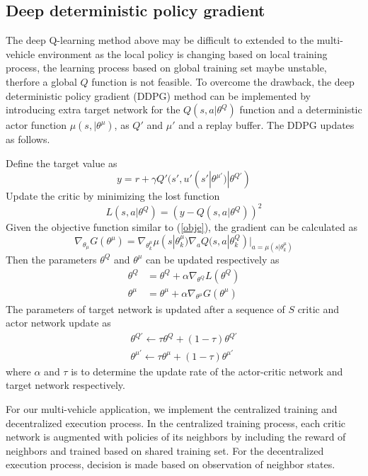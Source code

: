 \documentclass[letterpaper,10 pt,conference]{ieeeconf}
\begin{document}
\subsection{Deep deterministic policy gradient}
The deep Q-learning method above may be difficult to extended to the multi-vehicle environment as the local policy is changing based on local training process, the learning process based on global training set maybe unstable, therfore a global $Q$ function is not feasible. To overcome the drawback, the deep deterministic policy gradient (DDPG) method can be implemented by introducing extra target network for the $Q\left(s,a|\theta^Q\right)$ function and a deterministic actor function $\mu(s,|\theta^{\mu})$, as $Q'$ and $\mu'$ and a replay buffer. The DDPG updates as follows.

Define the target value as
\begin{equation}
y = r+\gamma Q'(s',u'(s'|\theta^{\mu'})|\theta^{Q'})
\end{equation}
Update the critic by minimizing the lost function
\begin{equation}
\label{begin}
L\left(s,a|\theta^Q\right) = \left(y-Q\left(s,a|\theta^Q\right)\right)^2
\end{equation}
Given the objective function similar to (\ref{obje}), the gradient can be calculated as
\begin{equation}
\nabla_{\theta_{\mu}}G(\theta^\mu) = \nabla_{\theta^\mu_k}\mu(s|\theta^\mu_k)\nabla_aQ(s,a|\theta^Q_k)|_{a = \mu(s|\theta^\mu_k)}
\end{equation}
Then the parameters $\theta^Q$ and $\theta^\mu$ can be updated respectively as 
\begin{align}
\theta^Q &= \theta^Q + \alpha\nabla_{\theta^Q}L(\theta^Q)\\
\theta^\mu &= \theta^\mu + \alpha \nabla_{\theta^\mu}G(\theta^\mu)
\end{align}
The parameters of target network is updated after a sequence of $S$ critic and actor network update as
\begin{align}
\theta^{Q'}\leftarrow\tau \theta^{Q} + (1-\tau) \theta^{Q'} \\
\label{end}\theta^{\mu'}\leftarrow\tau \theta^{\mu} + (1-\tau) \theta^{\mu'} 
\end{align} 
where $\alpha $ and $\tau$ is to determine the update rate of the actor-critic network and target network respectively.

For our multi-vehicle application, we implement the centralized training and decentralized execution process. In the centralized training process, each critic network is augmented with policies of its neighbors by including the reward of neighbors and trained based on shared training set.   For the decentralized execution process, decision is made based on observation of neighbor states.
\end{document}

